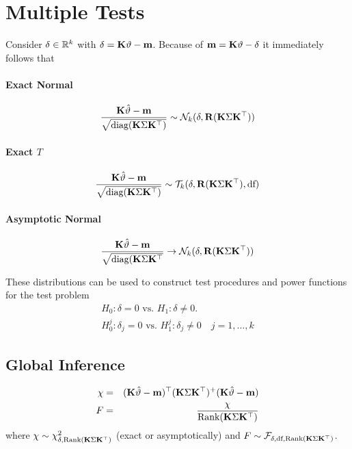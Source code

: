 \documentclass{article}
\begin{document}
\section{Multiple Tests}

Consider $\delta \in \mathbb{R}^k$ with $\delta = \mathbf{K} \vartheta - \mathbf{m}$. Because
of $\mathbf{m} = \mathbf{K} \vartheta - \delta$ it immediately
follows that
\paragraph{Exact Normal}
\begin{eqnarray*}
\frac{\mathbf{K} \hat{\vartheta} - \mathbf{m}}{\sqrt{\text{diag}(\mathbf{K} \Sigma \mathbf{K}^\top)}} \sim \mathcal{N}_k(\delta, \mathbf{R}(\mathbf{K} \Sigma \mathbf{K}^\top))
\end{eqnarray*}

\paragraph{Exact $T$}
\begin{eqnarray*}
\frac{\mathbf{K} \hat{\vartheta} - \mathbf{m}}{\sqrt{\text{diag}(\mathbf{K} \Sigma \mathbf{K}^\top)}} \sim 
    \mathcal{T}_k(\delta, \mathbf{R}(\mathbf{K} \Sigma \mathbf{K}^\top), \text{df})
\end{eqnarray*}

\paragraph{Asymptotic Normal}
\begin{eqnarray*}
\frac{\mathbf{K} \hat{\vartheta} - \mathbf{m}}{\sqrt{\text{diag}(\mathbf{K} \Sigma \mathbf{K}^\top}} \rightarrow
    \mathcal{N}_k(\delta, \mathbf{R}(\mathbf{K} \Sigma \mathbf{K}^\top))
\end{eqnarray*}

These distributions can be used to construct test procedures and power 
functions for the test problem
\begin{eqnarray*}
H_0: \delta = 0 \text{ vs. } H_1: \delta \neq 0. \\
H_0^j: \delta_j = 0 \text{ vs. } H_1^j: \delta_j \neq 0 \quad j = 1, \dots, k
\end{eqnarray*}

\subsection{Global Inference}
\begin{eqnarray*}
\chi & = & (\mathbf{K} \hat{\vartheta} - \mathbf{m})^\top (\mathbf{K} \Sigma \mathbf{K}^\top)^+ (\mathbf{K} \hat{\vartheta} - \mathbf{m}) \\
F & = & \frac{\chi}{\text{Rank}(\mathbf{K} \Sigma \mathbf{K}^\top)}
\end{eqnarray*}
where $\chi \sim \chi^2_{\delta, \text{Rank}(\mathbf{K} \Sigma \mathbf{K}^\top)}$ (exact or asymptotically)
and $F \sim \mathcal{F}_{\delta, \text{df}, \text{Rank}(\mathbf{K} \Sigma \mathbf{K}^\top)}$.
\end{document}
